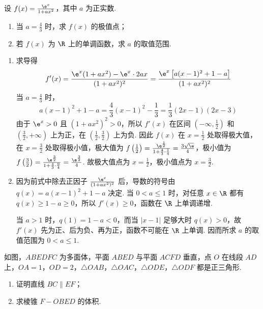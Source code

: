 \begin{problem}
设 \(f(x) = \frac{\e^{x}}{1 + ax^{2}}\)，其中 \(a\) 为正实数.
\begin{enumerate}
\item 当 \(a = \frac{4}{3}\) 时，求 \(f(x)\) 的极值点；
\item 若 \(f(x)\) 为 \(\R\) 上的单调函数，求 \(a\) 的取值范围.
\end{enumerate}
\end{problem}

\begin{solution}
\begin{enumerate}
\item 求导得
\[
f'(x)=\frac{\e^{x}(1+ax^{2})-\e^{x}\cdot2ax}{(1+ax^{2})^{2}}
=\frac{\e^{x}\left[a(x-1)^{2}+1-a\right]}{(1+ax^{2})^{2}}
\]
当 \(a=\frac43\) 时，
\[
a(x-1)^{2}+1-a=\frac43(x-1)^{2}-\frac13=\frac13(2x-1)(2x-3)
\]
由于 \(\e^{x}>0\) 且 \((1+ax^{2})^{2}>0\)，所以 \(f'(x)\) 在区间 \(\left(-\infty,\frac12\right)\) 和 \(\left(\frac32,+\infty\right)\) 上为正，在 \(\left(\frac12,\frac32\right)\) 上为负. 因此 \(f(x)\) 在 \(x=\frac12\) 处取得极大值，在 \(x=\frac32\) 处取得极小值，极大值为 \(f\left(\frac12\right)=\frac{\e^{\frac{1}{2}}}{1+\frac43\cdot\frac14}=\frac{3\sqrt{\e}}4\)，极小值为 \(f\left(\frac32\right)=\frac{\e^{\frac{3}{2}}}{1+\frac43\cdot\frac94}=\frac{\e^{\frac{3}{2}}}4\). 故极大值点为 \(x=\frac12\)，极小值点为 \(x=\frac32\).

\item 因为前式中除去正因子 \(\frac{\e^{x}}{(1+ax^{2})^{2}}\) 后，导数的符号由 \(q(x)=a(x-1)^{2}+1-a\) 决定. 当 \(0<a\leqslant1\) 时，对任意 \(x\in\R\) 都有 \(q(x)\geqslant1-a\geqslant0\)，所以 \(f'(x)\geqslant0\)，函数在 \(\R\) 上单调递增.

当 \(a>1\) 时，\(q(1)=1-a<0\)，而当 \(\lvert x-1\rvert\) 足够大时 \(q(x)>0\)，故 \(f'(x)\) 先为正、后为负、再为正，函数不可能在 \(\R\) 上单调. 因而所求 \(a\) 的取值范围为 \(0<a\leqslant1\).
\end{enumerate}
\end{solution}

\begin{problem}
如图，\(ABEDFC\) 为多面体，平面 \(ABED\) 与平面 \(ACFD\) 垂直，点 \(O\) 在线段 \(AD\) 上，\(OA = 1\)，\(OD = 2\)，\(\triangle OAB\)，\(\triangle OAC\)，\(\triangle ODE\)，\(\triangle ODF\) 都是正三角形.

\begin{enumerate}
\item 证明直线 \(BC \parallel EF\)；
\item 求棱锥 \(F - OBED\) 的体积.
\end{enumerate}

\end{problem}

